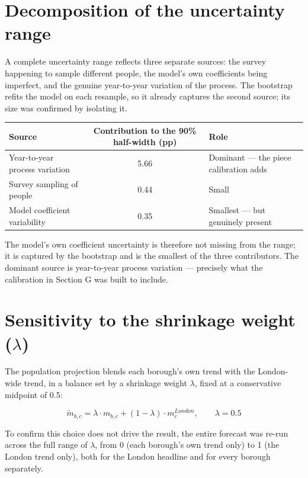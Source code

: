 \documentclass[ %
                    author={Ashrey Ashrey, Sanya Kapoor, Trisha Sharma, Yash Bhooshan Pandloskar},
                supervisor={Dr. Dalila O’Grady},
                    degree={MSc},
                     title={Using machine learning to forecast physical activity participation, volunteering and activity patterns in London},
                  subtitle={},
                      type={},
                      year={2021}]{dissertation}
\begin{document}
\section{Decomposition of the uncertainty range}

\noindent
A complete uncertainty range reflects three separate sources: the survey happening to sample different people, the model's own coefficients being imperfect, and the genuine year-to-year variation of the process. The bootstrap refits the model on each resample, so it already captures the second source; its size was confirmed by isolating it.

\begin{table}[!htb]
\centering
\begin{tabularx}{\textwidth}{@{}XcX@{}}
\toprule
\textbf{Source} & \textbf{Contribution to the 90\% half-width (pp)} & \textbf{Role} \\
\midrule
Year-to-year process variation & 5.66 & Dominant --- the piece calibration adds \\
Survey sampling of people & 0.44 & Small \\
Model coefficient variability & 0.35 & Smallest --- but genuinely present \\
\bottomrule
\end{tabularx}
\end{table}

The model's own coefficient uncertainty is therefore not missing from the range; it is captured by the bootstrap and is the smallest of the three contributors. The dominant source is year-to-year process variation --- precisely what the calibration in Section G was built to include.

\section{Sensitivity to the shrinkage weight (\texorpdfstring{\(\lambda\)}{lambda})}

\noindent
The population projection blends each borough's own trend with the London-wide trend, in a balance set by a shrinkage weight \(\lambda\), fixed at a conservative midpoint of 0.5:

\[
\widetilde{m}_{b,c}
=
\lambda \cdot m_{b,c}
+
(1-\lambda)\cdot m_c^{London},
\qquad
\lambda=0.5
\]

To confirm this choice does not drive the result, the entire forecast was re-run across the full range of \(\lambda\), from 0 (each borough's own trend only) to 1 (the London trend only), both for the London headline and for every borough separately.
\end{document}
